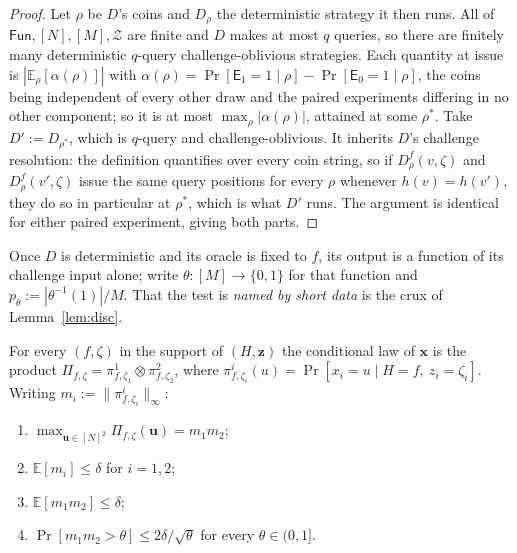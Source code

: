 \documentclass{aicr-solution}
\newcommand{\Fun}{\mathsf{Fun}}
\newcommand{\Prob}[1]{\Pr\!\left[#1\right]}
\newcommand{\Exp}{\mathbb{E}}
\newcommand{\bits}{\{0,1\}}
\newcommand{\vx}{\mathbf{x}}
\newcommand{\vz}{\mathbf{z}}
\newcommand{\vu}{\mathbf{u}}
\begin{document}
\begin{proof}
Let $\rho$ be $D$'s coins and $D_\rho$ the deterministic strategy it then runs.
All of $\Fun,[N],[M],\mathcal Z$ are finite and $D$ makes at most $q$ queries, so
there are finitely many deterministic $q$-query challenge-oblivious strategies.
Each quantity at issue is $|\Exp_\rho[\alpha(\rho)]|$ with
$\alpha(\rho)=\Prob{\mathsf E_1=1\mid\rho}-\Prob{\mathsf E_0=1\mid\rho}$, the
coins being independent of every other draw and the paired experiments differing
in no other component; so it is at most $\max_\rho|\alpha(\rho)|$, attained at
some $\rho^{*}$. Take $D':=D_{\rho^{*}}$, which is $q$-query and
challenge-oblivious. It inherits $D$'s challenge resolution: the definition
quantifies over every coin string, so if $D^{f}_{\rho}(v,\zeta)$ and
$D^{f}_{\rho}(v',\zeta)$ issue the same query positions for every $\rho$ whenever
$h(v)=h(v')$, they do so in particular at $\rho^{*}$, which is what $D'$ runs.
The argument is identical for either paired experiment, giving both parts.
\end{proof}

Once $D$ is deterministic and its oracle is fixed to $f$, its output is a
function of its challenge input alone; write $\theta:[M]\to\bits$ for that
function and $p_\theta:=|\theta^{-1}(1)|/M$. That the test is \emph{named by
short data} is the crux of Lemma~\ref{lem:disc}.

\begin{lemma}\label{lem:prod}
For every $(f,\zeta)$ in the support of $(H,\vz)$ the conditional law of $\vx$ is
the product $\Pi_{f,\zeta}=\pi^{1}_{f,\zeta_1}\otimes\pi^{2}_{f,\zeta_2}$, where
$\pi^{i}_{f,\zeta_i}(u)=\Prob{x_i=u\mid H=f,\ z_i=\zeta_i}$. Writing
$m_i:=\|\pi^{i}_{f,\zeta_i}\|_\infty$:
\begin{enumerate}
\item $\max_{\vu\in[N]^2}\Pi_{f,\zeta}(\vu)=m_1m_2$;
\item $\Exp[m_i]\le\delta$ for $i=1,2$;
\item $\Exp[m_1m_2]\le\delta$;
\item $\Prob{m_1m_2>\theta}\le2\delta/\sqrt\theta$ for every $\theta\in(0,1]$.
\end{enumerate}
\end{lemma}
\end{document}
